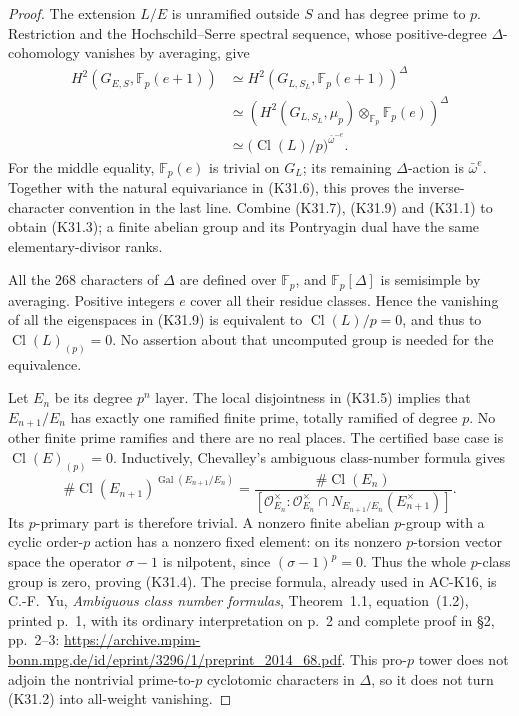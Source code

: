 \begin{proof}
The extension \(L/E\) is unramified outside \(S\) and has
degree prime to \(p\).  Restriction and the
Hochschild--Serre spectral sequence, whose positive-degree
\(\Delta\)-cohomology vanishes by averaging, give
\[
\begin{split}
 H^2(G_{E,S},\mathbb F_p(e+1))
 &\simeq H^2(G_{L,S_L},\mathbb F_p(e+1))^\Delta\\
 &\simeq
 \left(H^2(G_{L,S_L},\mu_p)\otimes_{\mathbb F_p}
                 \mathbb F_p(e)\right)^\Delta\\
 &\simeq
 \bigl(\operatorname{Cl}(L)/p\bigr)^{\bar\omega^{-e}}.
\end{split}                                                    \tag{K31.9}
\]
For the middle equality, \(\mathbb F_p(e)\) is trivial on
\(G_L\); its remaining \(\Delta\)-action is
\(\bar\omega^e\).  Together with the natural equivariance in
(K31.6), this proves the inverse-character convention in the
last line.  Combine (K31.7), (K31.9) and (K31.1) to obtain
(K31.3); a finite abelian group and its Pontryagin dual have
the same elementary-divisor ranks.

All the \(268\) characters of \(\Delta\) are defined over
\(\mathbb F_p\), and \(\mathbb F_p[\Delta]\) is semisimple
by averaging.  Positive integers \(e\) cover all their
residue classes.  Hence the vanishing of all the eigenspaces
in (K31.9) is equivalent to \(\operatorname{Cl}(L)/p=0\),
and thus to \(\operatorname{Cl}(L)_{(p)}=0\).  No assertion
about that uncomputed group is needed for the equivalence.

Let \(E_n\) be its degree \(p^n\) layer.  The local
disjointness in (K31.5) implies that \(E_{n+1}/E_n\) has
exactly one ramified finite prime, totally ramified of degree
\(p\).  No other finite prime ramifies and there are no real
places.  The certified base case is
\(\operatorname{Cl}(E)_{(p)}=0\).  Inductively, Chevalley's
ambiguous class-number formula gives
\[
 \#\operatorname{Cl}(E_{n+1})^{\operatorname{Gal}(E_{n+1}/E_n)}
 =\frac{\#\operatorname{Cl}(E_n)}
 {[\mathcal O_{E_n}^{\times}:
   \mathcal O_{E_n}^{\times}\cap
     N_{E_{n+1}/E_n}(E_{n+1}^{\times})]} .                    \tag{K31.10}
\]
Its \(p\)-primary part is therefore trivial.  A nonzero finite
abelian \(p\)-group with a cyclic order-\(p\) action has a
nonzero fixed element: on its nonzero \(p\)-torsion vector
space the operator \(\sigma-1\) is nilpotent, since
\((\sigma-1)^p=0\).  Thus the whole \(p\)-class group is
zero, proving (K31.4).  The precise formula, already used in
AC-K16, is C.-F.~Yu, \emph{Ambiguous class number formulas},
Theorem~1.1, equation~(1.2), printed p.~1, with its ordinary
interpretation on p.~2 and complete proof in \S2, pp.~2--3:
\url{https://archive.mpim-bonn.mpg.de/id/eprint/3296/1/preprint_2014_68.pdf}.
This pro-\(p\) tower does not adjoin the nontrivial
prime-to-\(p\) cyclotomic characters in \(\Delta\), so it
does not turn (K31.2) into all-weight vanishing.
\end{proof}

